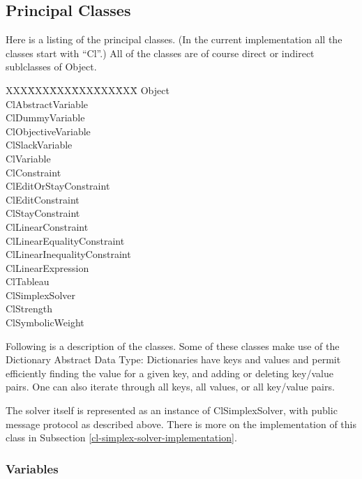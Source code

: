 \documentclass{article}
\begin{document}
\subsection{Principal Classes}

Here is a listing of the principal classes.  (In the current implementation
all the classes start with ``{\sf Cl}''.)  All of the classes are of course
direct or indirect sublclasses of {\sf Object}.

\begin{tabbing}
XXX\=XXX\=XXX\=XXX\=XXX\=XXX\=   \kill
\> {\sf Object} \\
\> \> {\sf ClAbstractVariable} \\
\> \> \> {\sf ClDummyVariable} \\
\> \> \> {\sf ClObjectiveVariable} \\
\> \> \> {\sf ClSlackVariable} \\
\> \> \> {\sf ClVariable} \\
\> \> {\sf ClConstraint} \\
\> \> \> {\sf ClEditOrStayConstraint} \\
\> \> \> \> {\sf ClEditConstraint} \\
\> \> \> \> {\sf ClStayConstraint} \\
\> \> \> {\sf ClLinearConstraint} \\
\> \> \> \> {\sf ClLinearEqualityConstraint} \\
\> \> \> \> {\sf ClLinearInequalityConstraint} \\
\> \> {\sf ClLinearExpression} \\
\> \> {\sf ClTableau} \\
\> \> \> {\sf ClSimplexSolver} \\
\> \> {\sf ClStrength} \\
\> \> {\sf ClSymbolicWeight}
\end{tabbing}

Following is a description of the classes.  Some of these classes make
use of the Dictionary Abstract Data Type: Dictionaries have keys and
values and permit efficiently finding the value
for a given key, and adding or deleting key/value pairs.  One can also
iterate through all keys, all values, or all key/value pairs.

The solver itself is represented as an instance of {\sf ClSimplexSolver},
with public message protocol as described above.  There is more on the
implementation of this class in Subsection 
\ref{cl-simplex-solver-implementation}.

\subsubsection{Variables}
\end{document}
